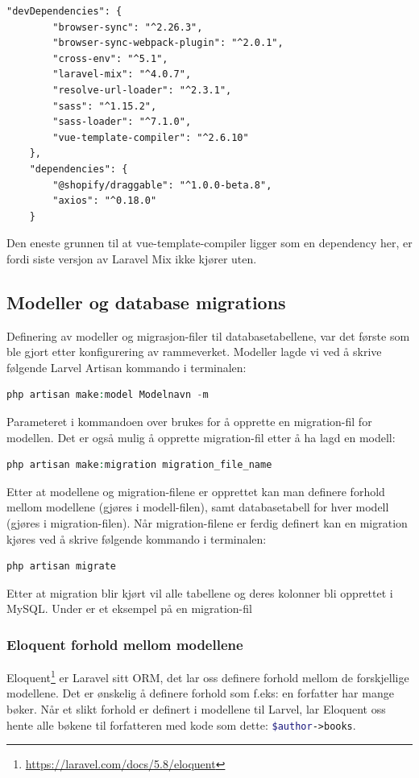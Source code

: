 \begin{lstlisting}[caption={Siste package.json}]
    "devDependencies": {
        "browser-sync": "^2.26.3",
        "browser-sync-webpack-plugin": "^2.0.1",
        "cross-env": "^5.1",
        "laravel-mix": "^4.0.7",
        "resolve-url-loader": "^2.3.1",
        "sass": "^1.15.2",
        "sass-loader": "^7.1.0",
        "vue-template-compiler": "^2.6.10"
    },
    "dependencies": {
        "@shopify/draggable": "^1.0.0-beta.8",
        "axios": "^0.18.0"
    }
\end{lstlisting}
Den eneste grunnen til at vue-template-compiler ligger som en dependency her, er fordi siste versjon av Laravel Mix ikke kjører uten.

\subsection{Modeller og database migrations}
Definering av modeller og migrasjon-filer til databasetabellene, var det første som ble gjort etter konfigurering av rammeverket.
Modeller lagde vi ved å skrive følgende Larvel Artisan kommando i terminalen:
\begin{lstlisting}[caption={Laravel Artisan kommando for oppretting av modell og migration},language=php]
    php artisan make:model Modelnavn -m
\end{lstlisting}
Parameteret  i kommandoen over brukes for å opprette en migration-fil for modellen. Det er også mulig å opprette migration-fil etter å ha lagd en modell:
\begin{lstlisting}[caption={Laravel Artisan kommando for oppretting av migration-fil},language=php]
    php artisan make:migration migration_file_name
\end{lstlisting}
Etter at modellene og migration-filene er opprettet kan man definere forhold mellom modellene (gjøres i modell-filen), samt databasetabell for hver modell (gjøres i migration-filen).
Når migration-filene er ferdig definert kan en migration kjøres ved å skrive følgende kommando i terminalen:
\begin{lstlisting}[caption={Laravel Artisan kommando for å kjøre migration},language=php]
    php artisan migrate
\end{lstlisting}
Etter at migration blir kjørt vil alle tabellene og deres kolonner bli opprettet i MySQL.
Under er et eksempel på en migration-fil


\subsubsection{Eloquent forhold mellom modellene}
Eloquent\footnote{\url{https://laravel.com/docs/5.8/eloquent}} er Laravel sitt ORM, det lar oss definere forhold mellom de forskjellige modellene. Det er ønskelig å definere forhold som f.eks: en forfatter har mange bøker. Når et slikt forhold er definert i modellene til Larvel, lar Eloquent oss hente alle bøkene til forfatteren med kode som dette: \lstinline[language=PHP]{$author->books}.

